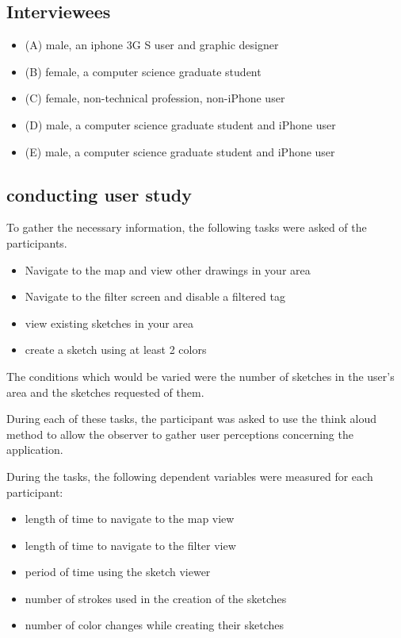 \documentclass{chi2009}
\begin{document}
\subsection{Interviewees}

\begin{itemize}
\item (A) male, an iphone 3G S user and graphic designer
\item (B) female, a computer science graduate student
\item (C) female, non-technical profession, non-iPhone user
\item (D) male, a computer science graduate student and iPhone user
\item (E) male, a computer science graduate student and iPhone user
\end{itemize}

\subsection{conducting user study}

To gather the necessary information, the following tasks were asked of the
participants.

\begin{itemize}
\item Navigate to the map and view other drawings in your area
\item Navigate to the filter screen and disable a filtered tag
\item view existing sketches in your area
\item create a sketch using at least 2 colors
\end{itemize}

The conditions which would be varied were the number of sketches in the user's
area and the sketches requested of them.

During each of these tasks, the participant was asked to use the think aloud
method to allow the observer to gather user perceptions concerning the
application.

During the tasks, the following dependent variables were measured for each participant:

\begin{itemize}
\item length of time to navigate to the map view
\item length of time to navigate to the filter view
\item period of time using the sketch viewer
\item number of strokes used in the creation of the sketches
\item number of color changes while creating their sketches
\end{itemize}
\end{document}

